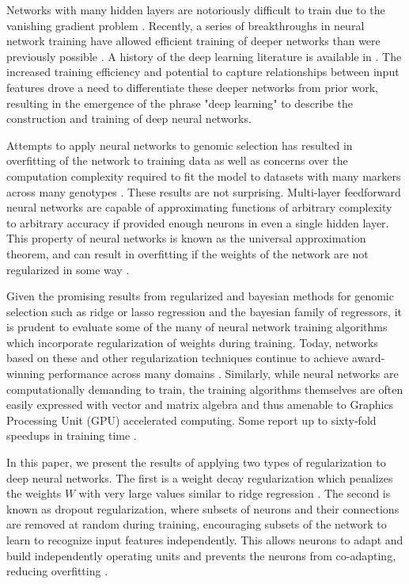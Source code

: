 
Networks with many hidden layers are notoriously difficult to train due to
the vanishing gradient problem \citep{hochreiter1998}. Recently, a series 
of breakthroughs in neural network training have allowed efficient 
training of deeper networks than were previously possible \citep{sutskever2013}.
A history of the deep learning literature is available in \cite{lecun2015}.
The increased training efficiency and potential to capture relationships 
between input features drove a need to differentiate these deeper networks
from prior work, resulting in the emergence of the phrase "deep learning" 
to describe the construction and training of deep neural networks.

Attempts to apply neural networks to genomic selection has resulted in overfitting of the 
network to training data as well as concerns over the 
computation complexity required to fit the model to datasets with many
markers across many genotypes \citep{heslot2012, gonzalez-recio2014}. 
These results are not surprising. Multi-layer feedforward neural networks 
are capable of approximating functions of arbitrary complexity to arbitrary 
accuracy if provided enough neurons in even a single hidden 
layer. This property of neural networks is known as the 
universal approximation theorem, and can result in 
overfitting if the weights of the network are not regularized in some way \citep{hornik1989}.

Given the promising results from regularized and bayesian methods for 
genomic selection such as ridge or lasso regression and the bayesian family of regressors,
it is prudent to evaluate some of the many of neural network training algorithms which
incorporate regularization of weights during training. Today, networks based on these 
and other regularization techniques continue to achieve award-winning performance 
across many domains \citep{schmidhuber2015}. Similarly, while neural networks are 
computationally demanding to train, the training algorithms 
themselves are often easily expressed with vector and matrix algebra and thus amenable to
Graphics Processing Unit (GPU) accelerated computing. Some report up to sixty-fold speedups 
in training time \citep{sierra2010, schmidhuber2015}. 

In this paper, we present the results of applying two types of regularization
to deep neural networks. The first is a weight decay regularization
which penalizes the weights $W$ with very large values 
similar to ridge regression \citep{krogh1992}. The second is known as dropout 
regularization, where subsets of neurons and their connections are removed 
at random during training, encouraging subsets of the network to learn 
to recognize input features independently. This allows neurons to adapt 
and build independently operating units and prevents the 
neurons from co-adapting, reducing overfitting \citep{srivastava2014}.  


